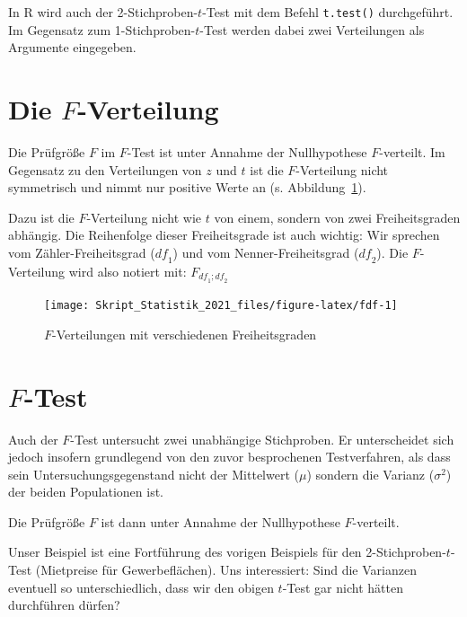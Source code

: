 \documentclass[
  11pt,
  ngerman,
  a4paper,
]{report}
\newenvironment{rtip}{
  \medskip
  \begin{tcolorbox}[colframe=purple,colback=light_gray,title=Softwarehinweis]
}{
  \end{tcolorbox}
  \medskip
}
\begin{document}
\begin{rtip}
In R wird auch der 2-Stichproben-$t$-Test mit dem Befehl \verb|t.test()| durchgeführt. Im Gegensatz zum 1-Stichproben-$t$-Test werden dabei zwei Verteilungen als Argumente eingegeben.
\end{rtip}

\hypertarget{die-f-verteilung}{%
\section{\texorpdfstring{Die \(F\)-Verteilung}{Die F-Verteilung}}\label{die-f-verteilung}}

Die Prüfgröße \(F\) im \(F\)-Test ist unter Annahme der Nullhypothese \(F\)-verteilt. Im Gegensatz zu den Verteilungen von \(z\) und \(t\) ist die \(F\)-Verteilung nicht symmetrisch und nimmt nur positive Werte an (s. Abbildung~\ref{fig:fdf}).

Dazu ist die \(F\)-Verteilung nicht wie \(t\) von einem, sondern von zwei Freiheitsgraden abhängig. Die Reihenfolge dieser Freiheitsgrade ist auch wichtig: Wir sprechen vom Zähler-Freiheitsgrad (\(\mathit{df}_1\)) und vom Nenner-Freiheitsgrad (\(\mathit{df}_2\)). Die \(F\)-Verteilung wird also notiert mit: \(F_{\mathit{df}_1;\mathit{df}_2}\)

\begin{figure}[!h]

{\centering \texttt{[image: Skript\_Statistik\_2021\_files/figure-latex/fdf-1]} 

}

\caption{$F$-Verteilungen mit verschiedenen Freiheitsgraden}\label{fig:fdf}
\end{figure}

\hypertarget{f-test}{%
\section{\texorpdfstring{\(F\)-Test}{F-Test}}\label{f-test}}

Auch der \(F\)-Test untersucht zwei unabhängige Stichproben. Er unterscheidet sich jedoch insofern grundlegend von den zuvor besprochenen Testverfahren, als dass sein Untersuchungsgegenstand nicht der Mittelwert (\(\mu\)) sondern die Varianz (\(\sigma^2\)) der beiden Populationen ist.

Die Prüfgröße \(F\) ist dann unter Annahme der Nullhypothese \(F\)-verteilt.

Unser Beispiel ist eine Fortführung des vorigen Beispiels für den 2-Stichproben-\(t\)-Test (Mietpreise für Gewerbeflächen). Uns interessiert: Sind die Varianzen eventuell so unterschiedlich, dass wir den obigen \(t\)-Test gar nicht hätten durchführen dürfen?
\end{document}
